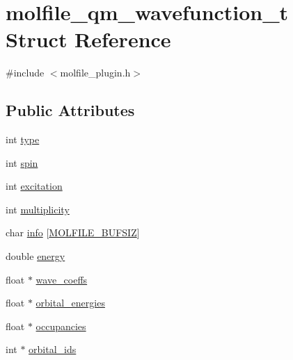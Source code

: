 \hypertarget{structmolfile__qm__wavefunction__t}{\section{molfile\-\_\-qm\-\_\-wavefunction\-\_\-t \-Struct \-Reference}
\label{structmolfile__qm__wavefunction__t}
}


{\ttfamily \#include $<$molfile\-\_\-plugin.\-h$>$}

\subsection*{\-Public \-Attributes}
\begin{DoxyCompactItemize}
\item 
int \hyperlink{structmolfile__qm__wavefunction__t_ac4aec71ed03be1d47745847ffb435009}{type}
\item 
int \hyperlink{structmolfile__qm__wavefunction__t_a9e9922bb35f3b103fdbcac7da63827f5}{spin}
\item 
int \hyperlink{structmolfile__qm__wavefunction__t_a46ff8816f806362106f9e550e385e289}{excitation}
\item 
int \hyperlink{structmolfile__qm__wavefunction__t_ab6f62ad30968e3da16edd859c5523119}{multiplicity}
\item 
char \hyperlink{structmolfile__qm__wavefunction__t_a5eda58c499658671a6f296e30807b788}{info} \mbox{[}\hyperlink{molfile__plugin_8h_adb121359484e3cbc0e035963e95ec867}{\-M\-O\-L\-F\-I\-L\-E\-\_\-\-B\-U\-F\-S\-I\-Z}\mbox{]}
\item 
double \hyperlink{structmolfile__qm__wavefunction__t_af575f54ea43a5504b153adee3feb4ecd}{energy}
\item 
float $\ast$ \hyperlink{structmolfile__qm__wavefunction__t_a9fbce35c7aa63a674152b34cf386ede6}{wave\-\_\-coeffs}
\item 
float $\ast$ \hyperlink{structmolfile__qm__wavefunction__t_acfd90a529cee8eee694388861dea3e96}{orbital\-\_\-energies}
\item 
float $\ast$ \hyperlink{structmolfile__qm__wavefunction__t_a3926a131683e99ca76de85c03ddab067}{occupancies}
\item 
int $\ast$ \hyperlink{structmolfile__qm__wavefunction__t_aef010c47af4d38b9d6dad535f4b2afd2}{orbital\-\_\-ids}
\end{DoxyCompactItemize}


